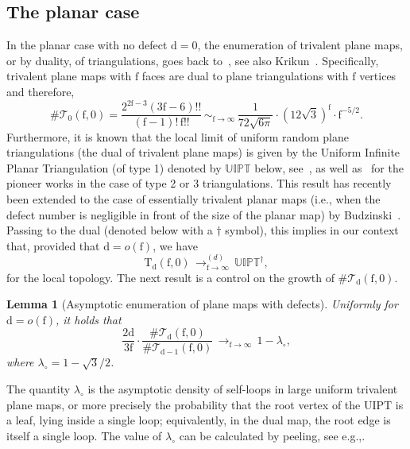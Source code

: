 \documentclass[11pt]{article}
\newcommand{\ie}{i.e.,\xspace}
\newcommand{\eg}{e.g.,\xspace}
\theoremstyle{plain}
\newtheorem{lemma}[theorem]{Lemma}
\theoremstyle{definition}
\theoremstyle{remark}
\newcommand{\Triv}{\mathrm{T}}
\newcommand{\face}{\mathrm{f}}
\newcommand{\defect}{\mathrm{d}}
\newcommand{\cv}[1][n]{\,\mathop{\longrightarrow}^{}_{#1 \to \infty}\,}
\newcommand{\cvloi}[1][n]{\,\mathop{\longrightarrow}^{(d)}_{#1 \to \infty}\,}
\newcommand{\equi}[1][n]{\,\mathop{\sim}^{}_{#1 \to \infty}\,}
\begin{document}
\subsection{The planar case}
\label{ssec:defaut_planar}

In the planar case with no defect $\defect=0$, the enumeration of trivalent plane maps, or by duality, of triangulations, goes back to~\cite{MNS70}, see also Krikun~\cite{Kri07}.
Specifically, trivalent plane maps with $\face$ faces are dual to plane triangulations with $\face$ vertices and therefore,
\begin{equation}\label{eq:triangulations}
\#\mathcal{T}_0(\face,0)
= \frac{2^{2\face-3} (3\face-6)!!}{(\face-1)! \, \face!!}
\equi[\face] \frac{1}{72 \sqrt{6\pi}} \cdot (12\sqrt{3})^\face \cdot \face^{-5/2}.
\end{equation}
Furthermore, it is known that the local limit of uniform random plane triangulations (the dual of trivalent plane maps) is given by the Uniform Infinite Planar Triangulation (of type 1) denoted by $\mathbb{UIPT}$ below, see~\cite[Th.\,6.1]{Ste18}, as well as~\cite{AS03} for the pioneer works in the case of type 2 or 3 triangulations. This result has recently been extended to the case of essentially trivalent planar maps (\ie when the defect number is negligible in front of the size of the planar map) by Budzinski~\cite[Cor.\,2]{Bud21}. Passing to the dual (denoted below with a $\dagger$ symbol), this implies in our context that, provided that $ \defect = o(\face)$, we have
\begin{equation} \label{eq:convUIPT}
\Triv_{ \defect}(\face, 0) \cvloi[\face] \mathbb{UIPT}^\dagger,
\end{equation}
for the local topology.
The next result is a control on the growth of $\#\mathcal{T}_ \defect(\face,0)$.

\begin{lemma}[Asymptotic enumeration of plane maps with defects]
\label{lem:ratio_defauts}
Uniformly for $\defect = o(\face)$, it holds that
\[
\frac{2 \defect}{3 \face} \cdot \frac{\#\mathcal{T}_{\defect}(\face, 0)}{\#\mathcal{T}_{\defect-1}(\face,0)} \cv[\face] 1-\lambda_{\circ},
\]
where $\lambda_{\circ} = 1 - \sqrt{3}/2$.\end{lemma}

The quantity $\lambda_{\circ}$ is the asymptotic density of self-loops in large uniform trivalent plane maps, or more precisely the probability that the root vertex of the UIPT is a leaf, lying inside a single loop; equivalently, in the dual map, the root edge is itself a single loop. The value of $\lambda_{\circ}$ can be calculated by peeling, see \eg \cite[\S 2]{CLG19}.
\end{document}
